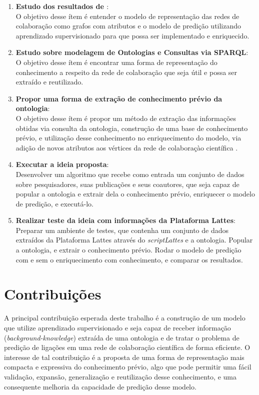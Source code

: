 \begin{enumerate}
    \item \textbf{Estudo dos resultados de \citet{Cervantes2014}}: \\
      O objetivo desse ítem é entender o modelo de representação das redes de colaboração como grafos com atributos e o modelo de predição utilizando aprendizado supervisionado para que possa ser implementado e enriquecido.
    \item \textbf{Estudo sobre modelagem de Ontologias e Consultas via SPARQL}: \\
      O objetivo desse ítem é encontrar uma forma de representação do conhecimento a respeito da rede de colaboração que seja útil e possa ser extraído e reutilizado.
    \item \textbf{Propor uma forma de extração de conhecimento prévio da ontologia}: \\
      O objetivo desse ítem é propor um método de extração das informações obtidas via consulta da ontologia, construção de uma base de conhecimento prévio, e utilização desse conhecimento no enriquecimento do modelo, via adição de novos atributos aos vértices da rede de colaboraçào científica .
    \item \textbf{Executar a ideia proposta}: \\
      Desenvolver um algoritmo que recebe como entrada um conjunto de dados sobre pesquisadores, suas publicações e seus coautores, que seja capaz de popular a ontologia e extrair dela o conhecimento prévio, enriquecer o modelo de predição, e executá-lo. %
    \item \textbf{Realizar teste da ideia com informações da Plataforma Lattes}: \\
      Preparar um ambiente de testes, que contenha um conjunto de dados extraídos da Plataforma Lattes através do \textit{scriptLattes} e a ontologia. Popular a ontologia, e extrair o conhecimento prévio. Rodar o modelo de predição com e sem o enriquecimento com conhecimento, e comparar os resultados. %
\end{enumerate}

\section{Contribuições}
\label{sec:contribucoes}

A principal contribuição esperada deste trabalho é a construção de um modelo que utilize aprendizado supervisionado e seja capaz de receber informação (\textit{background-knowledge}) extraída de uma ontologia e de tratar o problema de predição de ligações em uma rede de colaboração científica de forma eficiente.
O interesse de tal contribuição é a proposta de uma forma de representação mais compacta e expressiva do conhecimento prévio, algo que pode permitir uma fácil validação, expansão, generalização e reutilização desse conhecimento, e uma consequente melhoria da capacidade de predição desse modelo.

